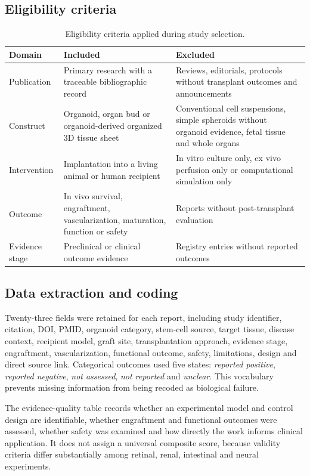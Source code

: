 \documentclass[11pt,a4paper]{article}
\begin{document}
\subsection{Eligibility criteria}

\begin{table}[H]
\centering
\caption{Eligibility criteria applied during study selection.}
\label{tab:eligibility}
\begin{tabularx}{\textwidth}{@{}P{27mm}YY@{}}
\toprule
\textbf{Domain} & \textbf{Included} & \textbf{Excluded}\\
\midrule
Publication & Primary research with a traceable bibliographic record & Reviews, editorials, protocols without transplant outcomes and announcements\\
Construct & Organoid, organ bud or organoid-derived organized 3D tissue sheet & Conventional cell suspensions, simple spheroids without organoid evidence, fetal tissue and whole organs\\
Intervention & Implantation into a living animal or human recipient & In vitro culture only, ex vivo perfusion only or computational simulation only\\
Outcome & In vivo survival, engraftment, vascularization, maturation, function or safety & Reports without post-transplant evaluation\\
Evidence stage & Preclinical or clinical outcome evidence & Registry entries without reported outcomes\\
\bottomrule
\end{tabularx}
\end{table}

\subsection{Data extraction and coding}

Twenty-three fields were retained for each report, including study identifier, citation, DOI, PMID, organoid category, stem-cell source, target tissue, disease context, recipient model, graft site, transplantation approach, evidence stage, engraftment, vascularization, functional outcome, safety, limitations, design and direct source link. Categorical outcomes used five states: \emph{reported positive}, \emph{reported negative}, \emph{not assessed}, \emph{not reported} and \emph{unclear}. This vocabulary prevents missing information from being recoded as biological failure.

The evidence-quality table records whether an experimental model and control design are identifiable, whether engraftment and functional outcomes were assessed, whether safety was examined and how directly the work informs clinical application. It does not assign a universal composite score, because validity criteria differ substantially among retinal, renal, intestinal and neural experiments.
\end{document}
